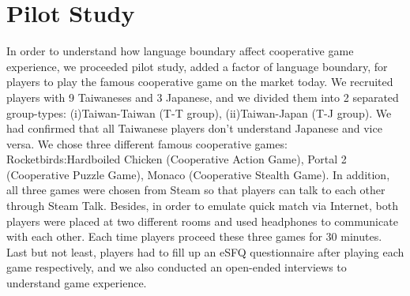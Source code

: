 \section{Pilot Study}


In order to understand how language boundary affect cooperative game experience, we proceeded pilot study, added a factor of language boundary, for players to play the famous cooperative game on the market today. We recruited players with 9 Taiwaneses and 3 Japanese, and we divided them into 2 separated group-types: (i)Taiwan-Taiwan (T-T group), (ii)Taiwan-Japan (T-J group). We had confirmed that all Taiwanese players don't understand Japanese and vice versa. We chose three different famous cooperative games: Rocketbirds:Hardboiled Chicken (Cooperative Action Game), Portal 2 (Cooperative Puzzle Game), Monaco (Cooperative Stealth Game). In addition, all three games were chosen from Steam\cite{PS1} so that players can talk to each other through Steam Talk. Besides, in order to emulate quick match via Internet, both players were placed at two different rooms and used headphones to communicate with each other. Each time players proceed these three games for 30 minutes. Last but not least, players had to fill up an eSFQ\cite{eSFQ} questionnaire after playing each game respectively, and we also conducted an open-ended interviews to understand game experience. 

